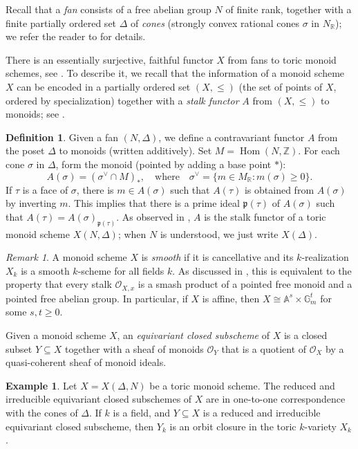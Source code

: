 \documentclass[12pt]{amsart}
\newcommand{\A}{\mathbb{A}}
\newcommand{\G}{\mathbb{G}}
\newcommand{\R}{\mathbb{R}}
\newcommand{\Z}{\mathbb{Z}}
\newcommand{\p}{\mathfrak{p}}
\newcommand{\Hom}{\operatorname{Hom}}
\numberwithin{equation}{section}
\theoremstyle{plain}
\theoremstyle{definition}
\newtheorem{defn}[equation]{Definition}
\newtheorem{ex}[equation]{Example}
\theoremstyle{remark}
\newtheorem{rem}[equation]{Remark}
\begin{document}
Recall that a {\it fan} consists of a free abelian group
$N$ of finite rank, together with a finite partially ordered set
$\Delta$ of {\it cones} (strongly convex rational cones $\sigma$
in $N_{\R}$); we refer the reader to \cite{Fulton} for details.

There is an essentially surjective, faithful functor $X$
from fans to toric monoid schemes, see \cite[4.2]{CHWW}. To describe it, we recall that the information of a monoid scheme $X$ can be encoded in a partially ordered set $(X,\leq)$ (the set of points of $X$, ordered by specialization) together with a {\it stalk functor} $A$ from $(X,\leq)$ to monoids; see \cite[Prop.\,2.11]{CHWW}.


\begin{defn}\label{fan-monoid-scheme}
Given a fan $(N,\Delta)$, we  define a contravariant functor $A$
from the poset $\Delta$ to monoids (written additively).
Set $M=\Hom(N,\Z)$.  
For each cone $\sigma $ in $\Delta$, form the monoid (pointed by adding a base point $\ast$):
\[
A(\sigma) = (\sigma^\vee\cap M)_\ast, \quad \textrm{where} \quad
\sigma^\vee = \{m\in M_\R: m(\sigma)\ge0\}.
\]
If $\tau$ is a face of $\sigma$, there is $m\in A(\sigma)$
  such that  $A(\tau)$ is obtained from $A(\sigma)$ by inverting $m$.
  This implies that there is a prime ideal $\p(\tau)$  of $A(\sigma)$
such that  $A(\tau)=A(\sigma)_{\p(\tau)}$.
As observed in \cite[4.2]{CHWW}, $A$ is the stalk functor of
a toric monoid scheme $X(N,\Delta)$;
when $N$ is understood, we just write $X(\Delta)$.
\end{defn}

\begin{rem}\label{rem:smooth-monoid-scheme}
	A monoid scheme $X$ is {\it smooth} if it is cancellative and its $k$-realization $X_k$ is a smooth $k$-scheme for all fields $k$. As discussed in \cite[Sec.\,6]{CHWW}, this is equivalent to the property that every stalk
	 $\mathcal{O}_{X,x}$ is a smash product of a pointed free monoid and a pointed free abelian group. In particular, if $X$ is affine, then $X\cong \A^s\times \G_m^t$ for some $s,t\geq 0$. 
\end{rem}

Given a monoid scheme $X$, an {\it equivariant closed subscheme} of $X$ is a closed subset $Y\subseteq X$ together with
 a sheaf of monoids $\mathcal{O}_Y$ that is a quotient of $\mathcal{O}_X$ by a quasi-coherent sheaf of monoid ideals.

\begin{ex}
	Let $X = X(\Delta, N)$ be a toric monoid scheme. The reduced and irreducible equivariant closed subschemes of $X$ are in one-to-one correspondence with the cones of $\Delta$. If $k$ is a field, and $Y\subseteq X$ is a reduced and irreducible equivariant closed subscheme, then $Y_k$ is an orbit closure in the toric $k$-variety $X_k$.
\end{ex} 
\end{document}
